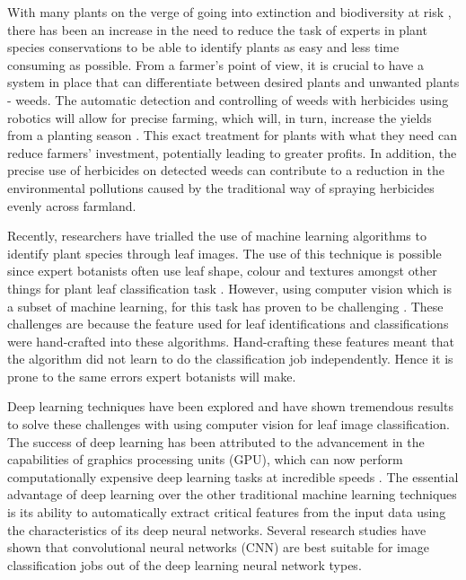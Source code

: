 \documentclass[conference]{IEEEtran}
\begin{document}
With many plants on the verge of going into extinction and biodiversity at risk \cite{pimm2015many}, there has been an increase in the need to reduce the task of experts in plant species conservations to be able to identify plants as easy and less time consuming as possible. From a farmer's point of view, it is crucial to have a system in place that can differentiate between desired plants and unwanted plants - weeds. The automatic detection and controlling of weeds with herbicides using robotics will allow for precise farming, which will, in turn, increase the yields from a planting season \cite{bah2018deep}. This exact treatment for plants with what they need can reduce farmers' investment, potentially leading to greater profits. In addition, the precise use of herbicides on detected weeds can contribute to a reduction in the environmental pollutions caused by the traditional way of spraying herbicides evenly across farmland.

Recently, researchers have trialled the use of machine learning algorithms to identify plant species through leaf images. The use of this technique is possible since expert botanists often use leaf shape, colour and textures amongst other things for plant leaf classification task \cite{xiao2010hog, kadir2013leaf}. However, using computer vision which is a subset of machine learning, for this task has proven to be challenging \cite{kamilaris2018deep}. These challenges are because the feature used for leaf identifications and classifications were hand-crafted into these algorithms. Hand-crafting these features meant that the algorithm did not learn to do the classification job independently. Hence it is prone to the same errors expert botanists will make.

Deep learning techniques have been explored and have shown tremendous results to solve these challenges with using computer vision for leaf image classification. The success of deep learning has been attributed to the advancement in the capabilities of graphics processing units (GPU), which can now perform computationally expensive deep learning tasks at incredible speeds \cite{campbell2020explosion}. The essential advantage of deep learning over the other traditional machine learning techniques is its ability to automatically extract critical features from the input data using the characteristics of its deep neural networks. Several research studies have shown that convolutional neural networks (CNN) are best suitable for image classification jobs out of the deep learning neural network types.
\end{document}
